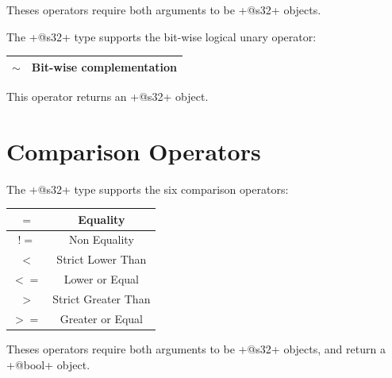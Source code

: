 Theses operators require both arguments to be \ggsq+@s32+ objects.\newline


The \ggsq+@s32+ type supports the bit-wise logical unary operator:\newline

\begin{tabular}{|c|c|}
\hline
$\sim$ & Bit-wise complementation \\
\hline
\end{tabular}

This operator returns an \ggsq+@s32+ object.







\section{Comparison Operators}

The \ggsq+@s32+ type supports the six comparison operators:\newline

\begin{tabular}{|c|c|}
\hline
$=$ & Equality \\
\hline
$!=$ & Non Equality \\
\hline
$<$  & Strict Lower Than \\
\hline
$<=$  & Lower or Equal \\
\hline
$>$  & Strict Greater Than \\
\hline
$>=$  & Greater or Equal \\
\hline
\end{tabular}

Theses operators require both arguments to be \ggsq+@s32+ objects, and return a \ggsq+@bool+ object.


